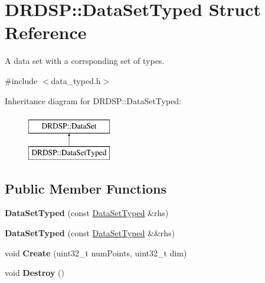 \hypertarget{struct_d_r_d_s_p_1_1_data_set_typed}{\section{D\-R\-D\-S\-P\-:\-:Data\-Set\-Typed Struct Reference}
\label{struct_d_r_d_s_p_1_1_data_set_typed}
}


A data set with a corrsponding set of types.  




{\ttfamily \#include $<$data\-\_\-typed.\-h$>$}

Inheritance diagram for D\-R\-D\-S\-P\-:\-:Data\-Set\-Typed\-:\begin{figure}[H]
\begin{center}
\leavevmode
\includegraphics[height=2.000000cm]{struct_d_r_d_s_p_1_1_data_set_typed}
\end{center}
\end{figure}
\subsection*{Public Member Functions}
\begin{DoxyCompactItemize}
\item 
\hypertarget{struct_d_r_d_s_p_1_1_data_set_typed_acb54ebaf165fd365edc9adaa05c9ae44}{{\bfseries Data\-Set\-Typed} (const \hyperlink{struct_d_r_d_s_p_1_1_data_set_typed}{Data\-Set\-Typed} \&rhs)}\label{struct_d_r_d_s_p_1_1_data_set_typed_acb54ebaf165fd365edc9adaa05c9ae44}

\item 
\hypertarget{struct_d_r_d_s_p_1_1_data_set_typed_a87f023734d2ace299859cfcc685c7797}{{\bfseries Data\-Set\-Typed} (const \hyperlink{struct_d_r_d_s_p_1_1_data_set_typed}{Data\-Set\-Typed} \&\&rhs)}\label{struct_d_r_d_s_p_1_1_data_set_typed_a87f023734d2ace299859cfcc685c7797}

\item 
\hypertarget{struct_d_r_d_s_p_1_1_data_set_typed_a57f2f8449d2390b76aa98de3dbde73ca}{void {\bfseries Create} (uint32\-\_\-t num\-Points, uint32\-\_\-t dim)}\label{struct_d_r_d_s_p_1_1_data_set_typed_a57f2f8449d2390b76aa98de3dbde73ca}

\item 
\hypertarget{struct_d_r_d_s_p_1_1_data_set_typed_ae6876dff24b83610eaed933ff2c5d8e4}{void {\bfseries Destroy} ()}\label{struct_d_r_d_s_p_1_1_data_set_typed_ae6876dff24b83610eaed933ff2c5d8e4}

\end{DoxyCompactItemize}
